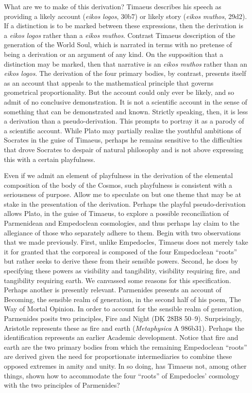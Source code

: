 What are we to make of this derivation? Timaeus describes his speech as providing a likely account (\emph{eikos logos}, 30b7) or likely story (\emph{eikos muthos}, 29d2). If a distinction is to be marked between these expressions, then the derivation is a \emph{eikos logos} rather than a \emph{eikos muthos}. Contrast Timaeus description of the generation of the World Soul, which is narrated in terms with no pretense of being a derivation or an argument of any kind. On the supposition that a distinction may be marked, then that narrative is an \emph{eikos muthos} rather than an \emph{eikos logos}. The derivation of the four primary bodies, by contrast, presents itself as an account that appeals to the mathematical principle that governs geometrical proportionality. But the account could only ever be likely, and so admit of no conclusive demonstration. It is not a scientific account in the sense of something that can be demonstrated and known. Strictly speaking, then, it is less a derivation than a pseudo-derivation. This prompts \citet{Prtichard:1990aa} to portray it as a parody of a scientific account. While Plato may partially realize the youthful ambitions of Socrates in the guise of Timaeus, perhaps he remains sensitive to the difficulties that drove Socrates to despair of natural philosophy and is not above expressing this with a certain playfulness.

Even if we admit an element of playfulness in the derivation of the elemental composition of the body of the Cosmos, such playfulness is consistent with a seriousness of purpose. Allow me to speculate on but one theme that may be at stake in the presentation of the derivation. Perhaps the playful pseudo-derivation allows Plato, in the guise of Timaeus, to explore a possible reconciliation of Parmenidean and Empedoclean cosmologies, and thus perhaps lay claim to the allegiance of those who separately adhere to them. Begin with two observations that we made previously. First, unlike Empedocles, Timaeus does not merely take it for granted that the corporeal is composed of the four Empedoclean ``roots'' but rather seeks to derive these from their sensible powers. Second, he does by specifying these powers as visibility and tangibility, visibility requiring fire, and tangibility requiring earth. We canvassed some reasons for this specification. Perhaps another is presently relevant. Parmenides presents an account of Becoming, the sensible realm of generation, in the second half of his poem, The Way of Mortal Opinion. In order to account for the sensible realm of generation, Parmenides posits two principles, Fire and Night (DK 28B8 50--9). Surprisingly, Aristotle represents these as fire and earth (\emph{Metaphysica} A 986b31). Perhaps the identification represents an earlier Academic development. Notice that fire and earth are the two primary bodies from which the remaining Empedoclean ``roots'' are derived given the need for proportionate intermediaries to combine these opposed extremes in amity and unity. In so doing, has Timaeus not, among other things, shown how to accommodate the four ``roots'' of Empedocles' cosmology with the two principles of Parmenides? 

